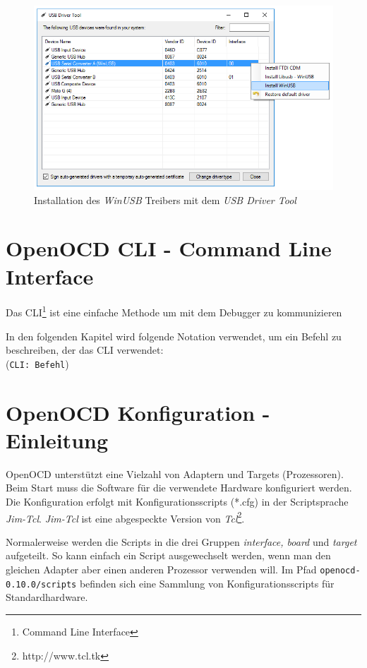 \begin{figure}[htbp]
	\centering
		\includegraphics[width=12cm,keepaspectratio]{images/InstallWinUSBDriver.png}
	\caption{Installation des \textit{WinUSB} Treibers mit dem \textit{USB Driver Tool}}
	\label{fig:InstallWinUSBDriver}
\end{figure}


\section{OpenOCD CLI - Command Line Interface}
Das CLI\footnote{Command Line Interface} ist eine einfache Methode um mit dem Debugger zu kommunizieren

In den folgenden Kapitel wird folgende Notation verwendet, um ein Befehl zu beschreiben, der das CLI verwendet:\\
(\texttt{CLI: Befehl})


\section{OpenOCD Konfiguration - Einleitung}
OpenOCD unterstützt eine Vielzahl von Adaptern und Targets (Prozessoren).
Beim Start muss die Software für die verwendete Hardware konfiguriert werden.
Die Konfiguration erfolgt mit Konfigurationsscripts (*.cfg) in der Scriptsprache \textit{Jim-Tcl}.
\textit{Jim-Tcl} ist eine abgespeckte Version von \textit{Tcl}\footnote{http://www.tcl.tk}.

Normalerweise werden die Scripts in die drei Gruppen \textit{interface, board} und \textit{target} aufgeteilt.
So kann einfach ein Script ausgewechselt werden, wenn man den gleichen Adapter aber einen anderen Prozessor verwenden will.
Im Pfad \texttt{openocd-0.10.0/scripts} befinden sich eine Sammlung von Konfigurationsscripts für Standardhardware.

